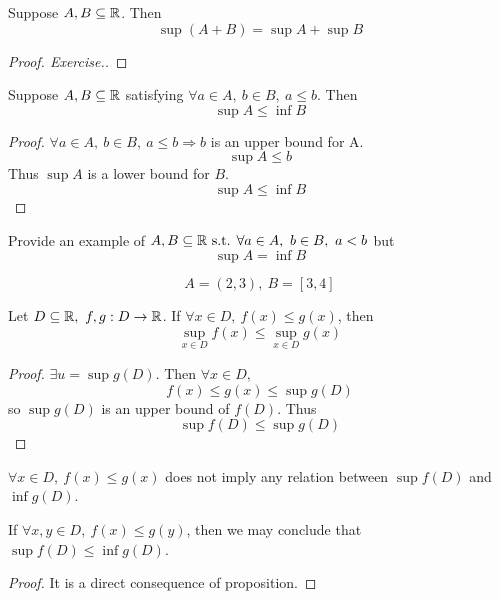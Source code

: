 \documentclass[a4paper,12pt]{article}
\begin{document}
\begin{proposition}
    Suppose \(A,B\subseteq\mathbb{R}\). Then
    \[\sup(A+B)=\sup A+\sup B\]
    \begin{proof}[Proof. Exercise.]
        
    \end{proof}
\end{proposition}

\begin{proposition}
    Suppose \(A,B\subseteq\mathbb{R}\) satisfying \(\forall a\in A,\ b\in B,\ a\le b\). Then 
    \[\sup A\le \inf B\]
    \begin{proof}
        \(\forall a\in A,\ b\in B,\ a\le b\Rightarrow b\) is an upper bound for A.
        \[\sup A\le b\]
        Thus \(\sup A\) is a lower bound for \(B\).
        \[\sup A\le\inf B\] 
    \end{proof}
\end{proposition}

\begin{exercise}
    Provide an example of \(A,B\subseteq\mathbb{R}\text{ s.t. } \forall a\in A,\ b\in B,\ a<b\) but 
    \[\sup A=\inf B\]
    \begin{example}
        \[A=(2,3),\ B=[3,4]\]
    \end{example}
\end{exercise}

\newpage

\begin{proposition}
    Let \(D\subseteq\R,\ f,g:D\rightarrow\R\). If \(\forall x\in D,\ f(x)\le g(x)\), then 
    \[\sup_{x\in D}f(x)\le \sup_{x\in D}g(x)\]
    \begin{proof}
        \(\exists u=\sup g(D)\). Then \(\forall x\in D,\)
        \[f(x)\le g(x)\le\sup g(D)\]
        so \(\sup g(D)\) is an upper bound of \(f(D)\). Thus 
        \[\sup f(D)\le \sup g(D)\]
    \end{proof}
\end{proposition}

\begin{remark}
    \(\forall x\in D,\ f(x)\le g(x)\) does not imply any relation between \(\sup f(D)\) and \(\inf g(D)\).\\
\end{remark}
\begin{proposition}
    If \(\forall x,y\in D,\ f(x)\le g(y)\), then we may conclude that \(\sup f(D)\le \inf g(D)\).
    \begin{proof}
        It is a direct consequence of proposition.
    \end{proof}
\end{proposition}
\end{document}
